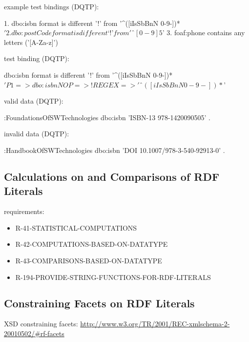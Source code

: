 \documentclass{llncs}
\begin{document}

example test bindings (DQTP):

\begin{ex}
1. dbo:isbn format is different ’!’ from '^([iIsSbBnN 0-9-])*$'
2. dbo:postCode format is different ‘!’ from 'ˆ[0-9]{5}$'
3. foaf:phone contains any letters ('[A-Za-z]')
\end{ex}

test binding (DQTP):

\begin{ex}
dbo:isbn format is different ’!’ from '^([iIsSbBnN 0-9-])*$'

P1 => dbo:isbn
NOP => !
REGEX => 'ˆ([iIsSbBnN 0-9-])*$'
\end{ex}

valid data (DQTP):

\begin{ex}
:FoundationsOfSWTechnologies
    dbo:isbn 'ISBN-13 978-1420090505' .
\end{ex}

invalid data (DQTP):

\begin{ex}
:HandbookOfSWTechnologies
    dbo:isbn 'DOI 10.1007/978-3-540-92913-0' .
\end{ex}

\subsection{Calculations on and Comparisons of RDF Literals}

requirements:

\begin{itemize}
	\item R-41-STATISTICAL-COMPUTATIONS
	\item R-42-COMPUTATIONS-BASED-ON-DATATYPE
	\item R-43-COMPARISONS-BASED-ON-DATATYPE
	\item R-194-PROVIDE-STRING-FUNCTIONS-FOR-RDF-LITERALS
\end{itemize}

\subsection{Constraining Facets on RDF Literals}

XSD constraining facets: \url{http://www.w3.org/TR/2001/REC-xmlschema-2-20010502/#rf-facets}
\end{document}
